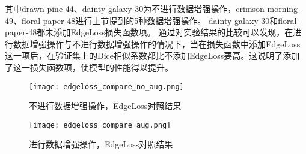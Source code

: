 \documentclass[AutoFakeBold]{LZUThesis}
\begin{document}
其中drawn-pine-44、dainty-galaxy-30为不进行数据增强操作，crimson-morning-49、floral-paper-48进行上节提到的5种数据增强操作。
dainty-galaxy-30和floral-paper-48都未添加EdgeLoss损失函数项。
通过对实验结果的比较可以发现，在进行数据增强操作与不进行数据增强操作的情况下，当在损失函数中添加EdgeLoss这一项后，在验证集上的Dice相似系数都比不添加EdgeLoss要高。这说明了添加了这一损失函数项，使模型的性能得以提升。
\begin{figure}[htbp]
    \centering
    \begin{minipage}[t]{0.45\linewidth}  %
        \centering
        \texttt{[image: edgeloss\_compare\_no\_aug.png]}
        \caption{不进行数据增强操作，EdgeLoss对照结果}
        \label{edgeloss_compare_no_aug}
    \end{minipage}
    \hfill%
    \begin{minipage}[t]{0.45\linewidth}
        \centering
        \texttt{[image: edgeloss\_compare\_aug.png]}
        \caption{进行数据增强操作，EdgeLoss对照结果}
        \label{edgeloss_compare_aug}
    \end{minipage}
\end{figure}



\end{document}
